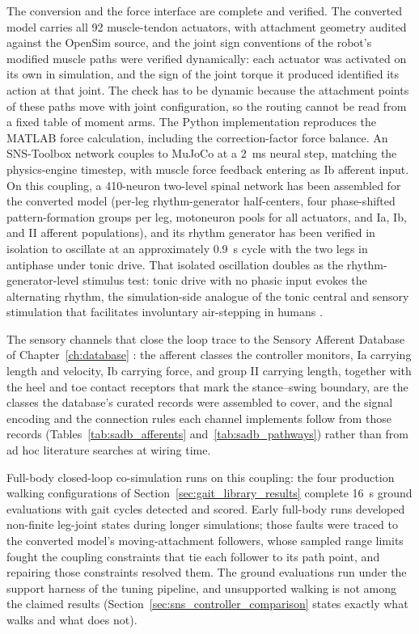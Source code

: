 The conversion and the force interface are complete and verified. The converted model carries all 92 muscle-tendon actuators, with attachment geometry audited against the OpenSim source, and the joint sign conventions of the robot's modified muscle paths were verified dynamically: each actuator was activated on its own in simulation, and the sign of the joint torque it produced identified its action at that joint. The check has to be dynamic because the attachment points of these paths move with joint configuration, so the routing cannot be read from a fixed table of moment arms. The Python implementation reproduces the MATLAB force calculation, including the correction-factor force balance. An SNS-Toolbox network couples to MuJoCo at a \qty{2}{\milli\second} neural step, matching the physics-engine timestep, with muscle force feedback entering as Ib afferent input. On this coupling, a 410-neuron two-level spinal network has been assembled for the converted model (per-leg rhythm-generator half-centers, four phase-shifted pattern-formation groups per leg, motoneuron pools for all actuators, and Ia, Ib, and II afferent populations), and its rhythm generator has been verified in isolation to oscillate at an approximately \qty{0.9}{\second} cycle with the two legs in antiphase under tonic drive. That isolated oscillation doubles as the rhythm-generator-level stimulus test: tonic drive with no phasic input evokes the alternating rhythm, the simulation-side analogue of the tonic central and sensory stimulation that facilitates involuntary air-stepping in humans \citep{selionov_tonic_2009}.

The sensory channels that close the loop trace to the Sensory Afferent Database of Chapter~\ref{ch:database} \citep{bolen_sensory_2023}: the afferent classes the controller monitors, Ia carrying length and velocity, Ib carrying force, and group II carrying length, together with the heel and toe contact receptors that mark the stance--swing boundary, are the classes the database's curated records were assembled to cover, and the signal encoding and the connection rules each channel implements follow from those records (Tables~\ref{tab:sadb_afferents} and~\ref{tab:sadb_pathways}) rather than from ad hoc literature searches at wiring time.

Full-body closed-loop co-simulation runs on this coupling: the four production walking configurations of Section~\ref{sec:gait_library_results} complete \qty{16}{\second} ground evaluations with gait cycles detected and scored. Early full-body runs developed non-finite leg-joint states during longer simulations; those faults were traced to the converted model's moving-attachment followers, whose sampled range limits fought the coupling constraints that tie each follower to its path point, and repairing those constraints resolved them. The ground evaluations run under the support harness of the tuning pipeline, and unsupported walking is not among the claimed results (Section~\ref{sec:sns_controller_comparison} states exactly what walks and what does not).

